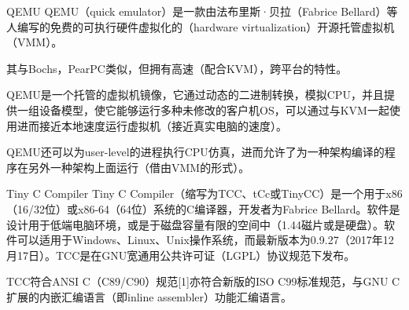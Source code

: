\documentclass{beamer}
\begin{document}
\begin{frame}[t]{QEMU}
QEMU（quick emulator）是一款由法布里斯·贝拉（Fabrice Bellard）等人编写的免费的可执行硬件虚拟化的（hardware virtualization）开源托管虚拟机（VMM）。

其与Bochs，PearPC类似，但拥有高速（配合KVM），跨平台的特性。

QEMU是一个托管的虚拟机镜像，它通过动态的二进制转换，模拟CPU，并且提供一组设备模型，使它能够运行多种未修改的客户机OS，可以通过与KVM一起使用进而接近本地速度运行虚拟机（接近真实电脑的速度）。

QEMU还可以为user-level的进程执行CPU仿真，进而允许了为一种架构编译的程序在另外一种架构上面运行（借由VMM的形式）。
\end{frame}

\begin{frame}[t]{Tiny C Compiler}
    Tiny C Compiler（缩写为TCC、tCc或TinyCC）是一个用于x86（16/32位）或x86-64（64位）系统的C编译器，开发者为Fabrice Bellard。软件是设计用于低端电脑环境，或是于磁盘容量有限的空间中（1.44磁片或是硬盘）。软件可以适用于Windows、Linux、Unix操作系统，而最新版本为0.9.27（2017年12月17日）。TCC是在GNU宽通用公共许可证（LGPL）协议规范下发布。

TCC符合ANSI C（C89/C90）规范[1]亦符合新版的ISO C99标准规范，与GNU C扩展的内嵌汇编语言（即inline assembler）功能汇编语言。
\end{frame}
\end{document}
